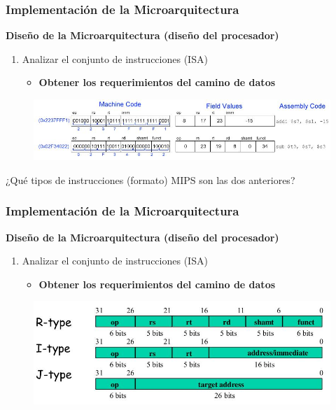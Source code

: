 \documentclass[aspectratio=169,compress]{beamer}
\begin{document}
\begin{footnotesize}
\begin{frame}
\frametitle{Implementación de la Microarquitectura}
\begin{center}\textbf{Diseño de la Microarquitectura (diseño del procesador)}\end{center}
\begin{enumerate}
\item Analizar el conjunto de instrucciones (ISA)
\begin{itemize}
\item \textbf{Obtener los requerimientos del camino de datos}
\end{itemize}
\end{enumerate}
\begin{figure}
\includegraphics[scale=0.4]{images/codigo-maquina.jpg} 
\end{figure}
¿Qué tipos de instrucciones (formato) MIPS son las dos anteriores?
\end{frame}

\begin{frame}
\frametitle{Implementación de la Microarquitectura}
\begin{center}\textbf{Diseño de la Microarquitectura (diseño del procesador)}\end{center}
\begin{enumerate}
\item Analizar el conjunto de instrucciones (ISA)
\begin{itemize}
\item \textbf{Obtener los requerimientos del camino de datos}
\end{itemize}
\end{enumerate}
\begin{figure}
\includegraphics[scale=0.4]{images/tipos-i.jpg} 
\end{figure}
\end{frame}


\end{footnotesize}
\end{document}
